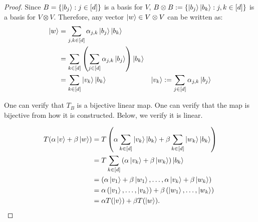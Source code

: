 \documentclass[12pt]{article}
\theoremstyle{plain}
\begin{document}
\begin{proof}
Since $B = \{\ket{b_j}: j \in [d]\}$ is a basis for $V$, $B\otimes B := \{\ket{b_j}\ket{b_k}: j,k \in [d] \}$ is a basis for $V \otimes V$. Therefore, any vector $\ket{w} \in V \otimes V$ can be written as:
\begin{align*}
    \ket{w} &= \sum\limits_{j, k \in [d]} \alpha_{j,k} \ket{b_j} \ket{b_k} \\
    &= \sum\limits_{k \in [d]} \left(\sum\limits_{j \in [d]} \alpha_{j,k} \ket{b_j}\right) \ket{b_k}\\
    &= \sum\limits_{k \in [d]} \ket{v_k} \ket{b_k} & \ket{v_k} := \sum\limits_{j \in [d]} \alpha_{j,k} \ket{b_j}
\end{align*}

One can verify that $T_B$ is a bijective linear map. One can verify that the map is bijective from how it is constructed. Below, we verify it is linear.

\begin{align*}
    T(\alpha \ket{v} + \beta \ket{w}) &= T \left( \alpha \sum\limits_{k \in [d]} \ket{v_k} \ket{b_k} + \beta \sum\limits_{k \in [d]} \ket{w_k} \ket{b_k} \right)\\
    &= T \sum\limits_{k \in [d]} \left(\alpha \ket{v_k} + \beta \ket{w_k}\right) \ket{b_k}\\
    &= \left(\alpha \ket{v_1} + \beta\ket{w_1}, \dots, \alpha \ket{v_k} + \beta \ket{w_k}\right)\\
    &= \alpha \left( \ket{v_1}, \dots, \ket{v_k} \right) + \beta \left(\ket{w_1}, \dots, \ket{w_k} \right)\\
    &= \alpha T(\ket{v}) + \beta T(\ket{w}).
\end{align*}



\end{proof}
\end{document}
